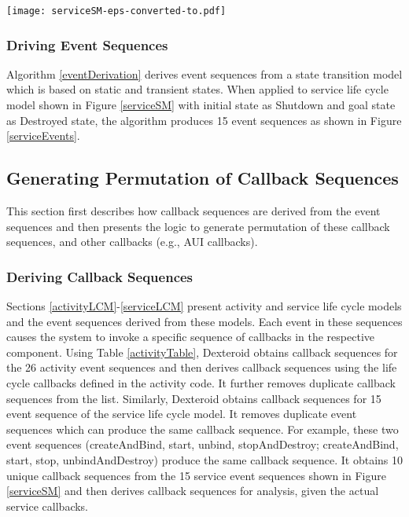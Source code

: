 \documentclass[10pt]{elsarticle}
\begin{document}
\begin{comment}
\begin{figure*}[ht!]
\centering
\epsfig{file=serviceSM.eps, width =120mm}
\caption{The Reverse-Engineered Service Life Cycle Model}
\label{serviceSM}
\end{figure*} 
\end{comment}

\begin{figure*}[ht!]
\centering
\texttt{[image: serviceSM-eps-converted-to.pdf]}
\caption{The Reverse-Engineered Service Life Cycle Model}
\label{serviceSM}
\end{figure*}


\subsubsection{Driving Event Sequences}

Algorithm \ref{eventDerivation} derives event sequences from a state transition model which is based on static and transient states. When applied to service life cycle model shown in Figure \ref{serviceSM} with initial state as Shutdown and goal state as Destroyed state, the algorithm produces 15 event sequences as shown in Figure \ref{serviceEvents}. 


\subsection {Generating Permutation of Callback Sequences}

This section first describes how callback sequences are derived from the event sequences and then presents the logic to generate permutation of these callback sequences, and other callbacks (e.g., AUI callbacks).

\subsubsection{Deriving Callback Sequences}

Sections \ref{activityLCM}-\ref{serviceLCM} present activity and service life cycle models and the event sequences derived from these models. Each event in these sequences causes the system to invoke a specific sequence of callbacks in the respective component. Using Table \ref{activityTable}, Dexteroid obtains callback sequences for the 26 activity event sequences and then derives callback sequences using the life cycle callbacks defined in the activity code. It further removes duplicate callback sequences from the list. Similarly, Dexteroid obtains callback sequences for 15 event sequence of the service life cycle model. It removes duplicate event sequences which can produce the same callback sequence. For example, these two event sequences (createAndBind, start, unbind, stopAndDestroy; createAndBind, start, stop, unbindAndDestroy) produce the same callback sequence. It obtains 10 unique callback sequences from the 15 service event sequences shown in Figure \ref{serviceSM} and then derives callback sequences for analysis, given the actual service callbacks. 
\end{document}
